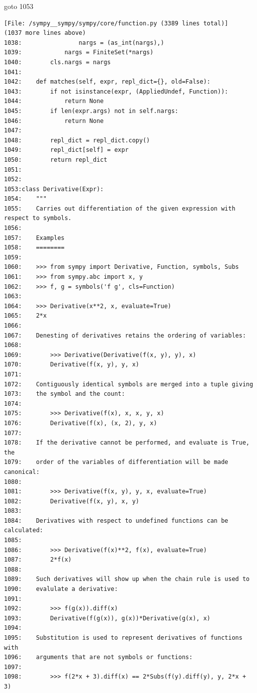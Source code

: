 {\begin{agentbox}
\hrulefill
\begin{CodeVerbatim}[breaklines=true, breakanywhere=true]
goto 1053
\end{CodeVerbatim}
\end{agentbox}
\begin{observationbox}\begin{Verbatim}[breaklines=true, breakanywhere=true]
[File: /sympy__sympy/sympy/core/function.py (3389 lines total)]
(1037 more lines above)
1038:                nargs = (as_int(nargs),)
1039:            nargs = FiniteSet(*nargs)
1040:        cls.nargs = nargs
1041:
1042:    def matches(self, expr, repl_dict={}, old=False):
1043:        if not isinstance(expr, (AppliedUndef, Function)):
1044:            return None
1045:        if len(expr.args) not in self.nargs:
1046:            return None
1047:
1048:        repl_dict = repl_dict.copy()
1049:        repl_dict[self] = expr
1050:        return repl_dict
1051:
1052:
1053:class Derivative(Expr):
1054:    """
1055:    Carries out differentiation of the given expression with respect to symbols.
1056:
1057:    Examples
1058:    ========
1059:
1060:    >>> from sympy import Derivative, Function, symbols, Subs
1061:    >>> from sympy.abc import x, y
1062:    >>> f, g = symbols('f g', cls=Function)
1063:
1064:    >>> Derivative(x**2, x, evaluate=True)
1065:    2*x
1066:
1067:    Denesting of derivatives retains the ordering of variables:
1068:
1069:        >>> Derivative(Derivative(f(x, y), y), x)
1070:        Derivative(f(x, y), y, x)
1071:
1072:    Contiguously identical symbols are merged into a tuple giving
1073:    the symbol and the count:
1074:
1075:        >>> Derivative(f(x), x, x, y, x)
1076:        Derivative(f(x), (x, 2), y, x)
1077:
1078:    If the derivative cannot be performed, and evaluate is True, the
1079:    order of the variables of differentiation will be made canonical:
1080:
1081:        >>> Derivative(f(x, y), y, x, evaluate=True)
1082:        Derivative(f(x, y), x, y)
1083:
1084:    Derivatives with respect to undefined functions can be calculated:
1085:
1086:        >>> Derivative(f(x)**2, f(x), evaluate=True)
1087:        2*f(x)
1088:
1089:    Such derivatives will show up when the chain rule is used to
1090:    evalulate a derivative:
1091:
1092:        >>> f(g(x)).diff(x)
1093:        Derivative(f(g(x)), g(x))*Derivative(g(x), x)
1094:
1095:    Substitution is used to represent derivatives of functions with
1096:    arguments that are not symbols or functions:
1097:
1098:        >>> f(2*x + 3).diff(x) == 2*Subs(f(y).diff(y), y, 2*x + 3)

\end{Verbatim}
\end{observationbox}}
